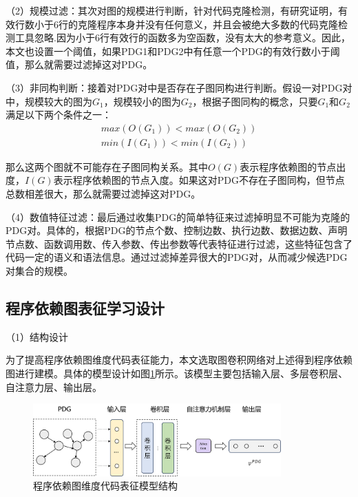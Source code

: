 （2）规模过滤：其次对图的规模进行判断，针对代码克隆检测，有研究证明，有效行数小于6行的克隆程序本身并没有任何意义，并且会被绝大多数的代码克隆检测工具忽略.因为小于6行有效行的函数多为空函数，没有太大的参考意义。因此，本文也设置一个阈值，如果PDG1和PDG2中有任意一个PDG的有效行数小于阈值，那么就需要过滤掉这对PDG。

（3）非同构判断：接着对PDG对中是否存在子图同构进行判断。假设一对PDG对中，规模较大的图为$G_1$，规模较小的图为$G_2$，根据子图同构的概念，只要$G_1$和$G_2$满足以下两个条件之一：
\begin{equation}\label{e5.1}
  \begin{split}
    max(O(G_1)) < max(O(G_2)) \\
    min(I(G_1)) < min(I(G_2))
  \end{split}
\end{equation}

那么这两个图就不可能存在子图同构关系。其中$O(G)$表示程序依赖图的节点出度，$I(G)$表示程序依赖图的节点入度。如果这对PDG不存在子图同构，但节点总数相差很大，那么就需要过滤掉这对PDG。

（4）数值特征过滤：最后通过收集PDG的简单特征来过滤掉明显不可能为克隆的PDG对。具体的，根据PDG的节点个数、控制边数、执行边数、数据边数、声明节点数、函数调用数、传入参数、传出参数等代表特征进行过滤，这些特征包含了代码一定的语义和语法信息。通过过滤掉差异很大的PDG对，从而减少候选PDG对集合的规模。


\subsection{程序依赖图表征学习设计}
\label{subsec:PDGModel}

（1）结构设计

为了提高程序依赖图维度代码表征能力，本文选取图卷积网络对上述得到程序依赖图进行建模。具体的模型设计如图\ref{fig:pdgmodel}所示。该模型主要包括输入层、多层卷积层、自注意力层、输出层。
\begin{figure}[H]
  \centering
  \includegraphics[width=0.85\textwidth]{figures/pdgmodel.png}
  \caption{程序依赖图维度代码表征模型结构}\label{fig:pdgmodel}
\end{figure}

